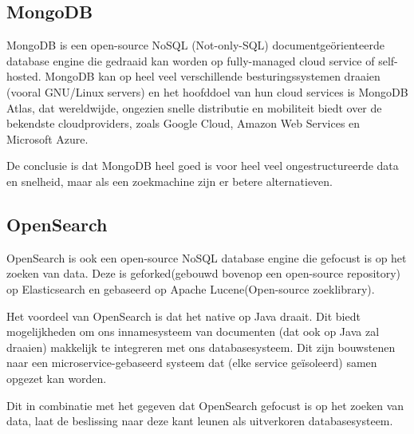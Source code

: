 \subsection{MongoDB}
MongoDB is een open-source NoSQL (Not-only-SQL) documentgeörienteerde database engine die gedraaid kan worden op fully-managed cloud service of self-hosted. 
MongoDB kan op heel veel verschillende besturingssystemen draaien (vooral GNU/Linux servers) en het hoofddoel van hun cloud services is MongoDB Atlas, dat wereldwijde, 
ongezien snelle distributie en mobiliteit biedt over de bekendste cloudproviders, zoals Google Cloud, Amazon Web Services en Microsoft Azure. 

De conclusie is dat MongoDB heel goed is voor heel veel ongestructureerde data en snelheid, maar als een zoekmachine zijn er betere alternatieven. 

\subsection{OpenSearch}
OpenSearch is ook een open-source NoSQL database engine die gefocust is op het zoeken van data. 
Deze is geforked(gebouwd bovenop een open-source repository) op Elasticsearch en gebaseerd op Apache Lucene(Open-source zoeklibrary). 

Het voordeel van OpenSearch is dat het native op Java draait. 
Dit biedt mogelijkheden om ons innamesysteem van documenten (dat ook op Java zal draaien) makkelijk te integreren met ons databasesysteem. 
Dit zijn bouwstenen naar een microservice-gebaseerd systeem dat (elke service geïsoleerd) samen opgezet kan worden. 

Dit in combinatie met het gegeven dat OpenSearch gefocust is op het zoeken van data, laat de beslissing naar deze kant leunen als uitverkoren databasesysteem. 



